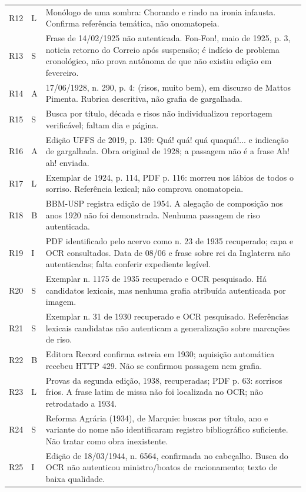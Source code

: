 \begin{longtable}{p{}p{}p{}}
R12 & L & Monólogo de uma sombra: Chorando e rindo na ironia infausta. Confirma referência temática, não onomatopeia.\\
R13 & S & Frase de 14/02/1925 não autenticada. Fon-Fon!, maio de 1925, p. 3, noticia retorno do Correio após suspensão; é indício de problema cronológico, não prova autônoma de que não existiu edição em fevereiro.\\
R14 & A & 17/06/1928, n. 290, p. 4: (risos, muito bem), em discurso de Mattos Pimenta. Rubrica descritiva, não grafia de gargalhada.\\
R15 & S & Busca por título, década e risos não individualizou reportagem verificável; faltam dia e página.\\
R16 & A & Edição UFFS de 2019, p. 139: Quá! quá! quá quaquá!... e indicação de gargalhada. Obra original de 1928; a passagem não é a frase Ah! ah! enviada.\\
R17 & L & Exemplar de 1924, p. 114, PDF p. 116: morreu nos lábios de todos o sorriso. Referência lexical; não comprova onomatopeia.\\
R18 & B & BBM-USP registra edição de 1954. A alegação de composição nos anos 1920 não foi demonstrada. Nenhuma passagem de riso autenticada.\\
R19 & I & PDF identificado pelo acervo como n. 23 de 1935 recuperado; capa e OCR consultados. Data de 08/06 e frase sobre rei da Inglaterra não autenticadas; falta conferir expediente legível.\\
R20 & S & Exemplar n. 1175 de 1935 recuperado e OCR pesquisado. Há candidatos lexicais, mas nenhuma grafia atribuída autenticada por imagem.\\
R21 & S & Exemplar n. 31 de 1930 recuperado e OCR pesquisado. Referências lexicais candidatas não autenticam a generalização sobre marcações de riso.\\
R22 & B & Editora Record confirma estreia em 1930; aquisição automática recebeu HTTP 429. Não se confirmou passagem nem grafia.\\
R23 & L & Provas da segunda edição, 1938, recuperadas; PDF p. 63: sorrisos frios. A frase latim de missa não foi localizada no OCR; não retrodatado a 1934.\\
R24 & S & Reforma Agrária (1934), de Marquie: buscas por título, ano e variante do nome não identificaram registro bibliográfico suficiente. Não tratar como obra inexistente.\\
R25 & I & Edição de 18/03/1944, n. 6564, confirmada no cabeçalho. Busca do OCR não autenticou ministro/boatos de racionamento; texto de baixa qualidade.\\

\end{longtable}
